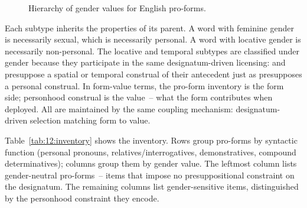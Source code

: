 \begin{figure}[htbp]
\centering
{}
\caption{Hierarchy of gender values for English pro-forms.}
\label{fig:12:hierarchy}
\end{figure}

Each subtype inherits the properties of its parent. A word with feminine gender is necessarily sexual, which is necessarily personal. A word with locative gender is necessarily non-personal. The locative and temporal subtypes are classified under gender because they participate in the same designatum-driven licensing:  and  presuppose a spatial or temporal construal of their antecedent just as  presupposes a personal construal. In form-value terms, the pro-form inventory is the form side; personhood construal is the value~-- what the form contributes when deployed. All are maintained by the same coupling mechanism: designatum-driven selection matching form to value.

Table~\ref{tab:12:inventory} shows the inventory. Rows group pro-forms by syntactic function (personal pronouns, relatives/interrogatives, demonstratives, compound determinatives); columns group them by gender value. The leftmost column lists gender-neutral pro-forms~-- items that impose no presuppositional constraint on the designatum. The remaining columns list gender-sensitive items, distinguished by the personhood constraint they encode.

